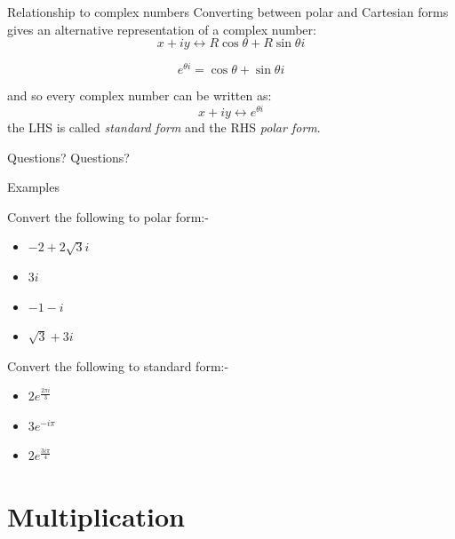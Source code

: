 \documentclass{beamer}
\begin{document}
\begin{frame}{Relationship to complex numbers}
Converting between polar and Cartesian forms gives an alternative representation of a complex number:
\begin{equation*}
x+iy \leftrightarrow R\cos\theta + R\sin\theta i
\end{equation*}
\begin{theorem}
\begin{equation*}
e^{\theta i} = \cos\theta + \sin\theta i
\end{equation*}
\end{theorem}
and so every complex number can be written as:
\begin{equation*}
x+iy \leftrightarrow e^{\theta i}
\end{equation*}
the LHS is called \emph{standard form} and the RHS \emph{polar form}.
\end{frame}

\begin{frame}{Questions?}
Questions?
\end{frame}

\begin{frame}{Examples}
\begin{example}
Convert the following to polar form:-
\begin{itemize}
	\item $-2+2\sqrt{3}i$ %
	\item $3i$ %
	\item $-1-i$ %
	\item $\sqrt{3}+3i$ %
\end{itemize}
\end{example}
\begin{example}
Convert the following to standard form:-
\begin{itemize}
	\item $2e^{\frac{2\pi i}{3}}$ %
	\item $3e^{-i\pi}$ %
	\item $2e^{\frac{3i\pi}{4}}$
\end{itemize}
\end{example}
\end{frame}

\section{Multiplication}
\end{document}
